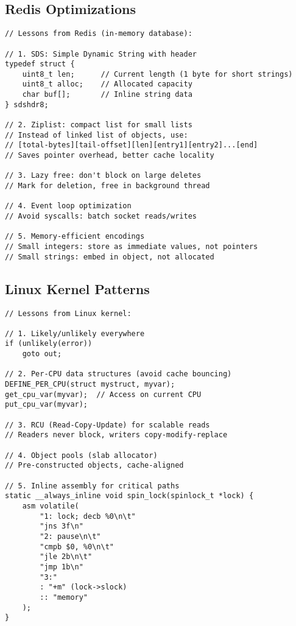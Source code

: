 \subsection{Redis Optimizations}

\begin{lstlisting}
// Lessons from Redis (in-memory database):

// 1. SDS: Simple Dynamic String with header
typedef struct {
    uint8_t len;      // Current length (1 byte for short strings)
    uint8_t alloc;    // Allocated capacity
    char buf[];       // Inline string data
} sdshdr8;

// 2. Ziplist: compact list for small lists
// Instead of linked list of objects, use:
// [total-bytes][tail-offset][len][entry1][entry2]...[end]
// Saves pointer overhead, better cache locality

// 3. Lazy free: don't block on large deletes
// Mark for deletion, free in background thread

// 4. Event loop optimization
// Avoid syscalls: batch socket reads/writes

// 5. Memory-efficient encodings
// Small integers: store as immediate values, not pointers
// Small strings: embed in object, not allocated
\end{lstlisting}

\subsection{Linux Kernel Patterns}

\begin{lstlisting}
// Lessons from Linux kernel:

// 1. Likely/unlikely everywhere
if (unlikely(error))
    goto out;

// 2. Per-CPU data structures (avoid cache bouncing)
DEFINE_PER_CPU(struct mystruct, myvar);
get_cpu_var(myvar);  // Access on current CPU
put_cpu_var(myvar);

// 3. RCU (Read-Copy-Update) for scalable reads
// Readers never block, writers copy-modify-replace

// 4. Object pools (slab allocator)
// Pre-constructed objects, cache-aligned

// 5. Inline assembly for critical paths
static __always_inline void spin_lock(spinlock_t *lock) {
    asm volatile(
        "1: lock; decb %0\n\t"
        "jns 3f\n"
        "2: pause\n\t"
        "cmpb $0, %0\n\t"
        "jle 2b\n\t"
        "jmp 1b\n"
        "3:"
        : "+m" (lock->slock)
        :: "memory"
    );
}
\end{lstlisting}

